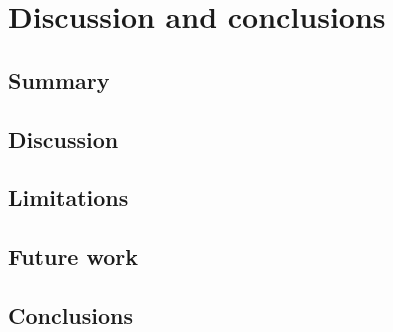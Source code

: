
\chapter{Discussion and conclusions}
\label{ch:conclusions}

\section{Summary}
\label{sec:summary}

\section{Discussion}
\label{sec:discussion}

\section{Limitations}
\label{sec:limitations}

\section{Future work}
\label{sec:future}

\section{Conclusions}
\label{sec:conclusions}

